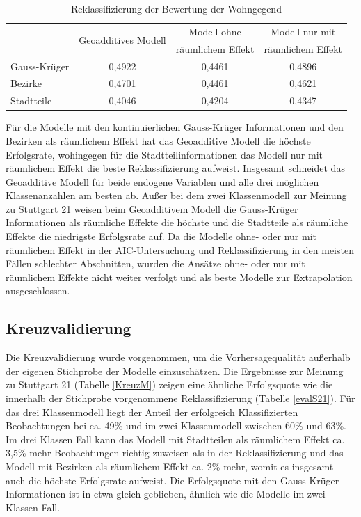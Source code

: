 \documentclass{Vorlage}
\begin{document}
\begin{table}[h]
\centering
\caption{Reklassifizierung der Bewertung der Wohngegend}
\label{evalB}
\begin{tabular}{l|c|c|c}
\hline \hline
             & \multirow{2}{*}{Geoadditives Modell} & Modell ohne       & Modell nur mit    \\
             &                                      & räumlichem Effekt & räumlichem Effekt \\ \hline
Gauss-Krüger & 0,4922                               & 0,4461            & 0,4896            \\
Bezirke      & 0,4701                               & 0,4461            & 0,4621            \\
Stadtteile   & 0,4046                               & 0,4204            & 0,4347            \\ \hline \hline
\end{tabular}
\end{table}

Für die Modelle mit den kontinuierlichen Gauss-Krüger Informationen und den Bezirken als räumlichem Effekt hat das Geoadditive Modell die höchste Erfolgsrate, wohingegen für die Stadtteilinformationen das Modell nur mit räumlichem Effekt die beste Reklassifizierung aufweist. Insgesamt schneidet das Geoadditive Modell für beide endogene Variablen und alle drei möglichen Klassenanzahlen am besten ab. Außer bei dem zwei Klassenmodell zur Meinung zu Stuttgart 21 weisen beim Geoadditivem Modell die Gauss-Krüger Informationen als räumliche Effekte die höchste und die Stadtteile als räumliche Effekte die niedrigste Erfolgsrate auf. Da die Modelle ohne- oder nur mit räumlichem Effekt in der AIC-Untersuchung und Reklassifizierung in den meisten Fällen schlechter Abschnitten, wurden die Ansätze ohne- oder nur mit räumlichem Effekte nicht weiter verfolgt und als beste Modelle zur Extrapolation ausgeschlossen.

\subsection{Kreuzvalidierung}

Die Kreuzvalidierung wurde vorgenommen, um die Vorhersagequalität außerhalb der eigenen Stichprobe der Modelle einzuschätzen. Die Ergebnisse zur Meinung zu Stuttgart 21 (Tabelle \ref{KreuzM}) zeigen eine ähnliche Erfolgsquote wie die innerhalb der Stichprobe vorgenommene Reklassifizierung (Tabelle \ref{evalS21}). Für das drei Klassenmodell liegt der Anteil der erfolgreich Klassifizierten Beobachtungen bei ca. 49\% und im zwei Klassenmodell zwischen 60\% und 63\%. Im drei Klassen Fall kann das Modell mit Stadtteilen als räumlichem Effekt ca. 3,5\%  mehr Beobachtungen richtig zuweisen als in der Reklassifizierung und das Modell mit Bezirken als räumlichem Effekt ca. 2\% mehr, womit es insgesamt auch die höchste Erfolgsrate aufweist. Die Erfolgsquote mit den Gauss-Krüger Informationen ist in etwa gleich geblieben, ähnlich wie die Modelle im zwei Klassen Fall.
 
\end{document}
